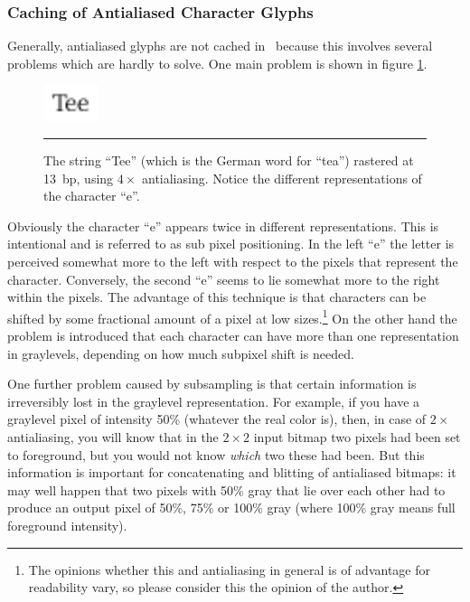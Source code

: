 \subsubsection{Caching of Antialiased Character Glyphs} 
\label{aacaching}%
Generally, antialiased glyphs are not cached in \tonelib\ because this
involves several problems which are hardly to solve. One main problem is shown
in figure \ref{figure:subpixelpositioning}.
\begin{figure}
\centerline{\includegraphics[scale=10]{Tee}}\relax
\vskip3mm
\hrule\vskip3mm\small
\caption{\label{figure:subpixelpositioning} The string ``Tee'' (which is the
  German word for ``tea'') rastered at 13~bp, using $4\times$ antialiasing.
  Notice the different representations of the character ``e''.} 
\end{figure}
Obviously the character ``e'' appears twice in different representations. This
is intentional and is referred to as sub pixel positioning. In the left ``e''
the letter is perceived somewhat more to the left with respect to the pixels
that represent the character. Conversely, the second ``e'' seems to lie
somewhat more to the right within the pixels. The advantage of this technique 
is that characters can be shifted by some fractional amount of a pixel at low
sizes.\footnote{The opinions whether this and antialiasing in general is of
  advantage for readability vary, so please consider this the opinion of the
  author. } On the other hand the problem is introduced that each character
can have more than one representation in graylevels, depending on how much
subpixel shift is needed. 

One further problem caused by subsampling is that certain information is
irreversibly lost in the graylevel representation. For example, if you have a
graylevel pixel of intensity 50\% (whatever the real color is), then, in case
of $2\times$ antialiasing, you will know that in the $2\times 2$ input bitmap
two pixels had been set to foreground, but you would not know {\em which} two
these had been. But this information is important for concatenating and
blitting of antialiased bitmaps: it may well happen that two pixels with 50\%
gray that lie over each other had to produce an output pixel of 50\%, 75\%
or 100\% gray (where 100\% gray means full foreground intensity).

